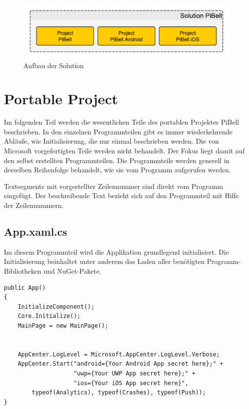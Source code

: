 \begin{figure}[H]
\centering\includegraphics[width=0.9\linewidth]{images/xamarin/struktur.pdf}
\caption{Aufbau der Solution}
\end{figure}

%
\section{Portable Project}
Im folgenden Teil werden die wesentlichen Teile des portablen Projektes PiBell beschrieben.
In den einzelnen Programmteilen gibt es immer wiederkehrende Abläufe, wie Initialisierung, die nur einmal beschrieben werden.
Die von Microsoft vorgefertigten Teile werden nicht behandelt.
Der Fokus liegt damit auf den selbst erstellten Programmteilen.
Die Programmteile werden generell in derselben Reihenfolge behandelt, wie sie vom Programm aufgerufen werden.\par

Textsegmente mit vorgestellter Zeilennummer sind direkt vom Programm eingefügt.
Der beschreibende Text bezieht sich auf den Programmteil mit Hilfe der Zeilennummern.

\subsection{App.xaml.cs}
\label{ssec:app-xaml-cs}
Im diesem Programmteil wird die Applikation grundlegend initialisiert.
Die Initialisierung beinhaltet unter anderem das Laden aller benötigten Programm-Bibliotheken und NuGet-Pakete.
\begin{verbatim}
public App()
{
    InitializeComponent();
    Core.Initialize();
    MainPage = new MainPage();


    AppCenter.LogLevel = Microsoft.AppCenter.LogLevel.Verbose;
    AppCenter.Start("android={Your Android App secret here};" +
                    "uwp={Your UWP App secret here};" +
                    "ios={Your iOS App secret here}",
        typeof(Analytics), typeof(Crashes), typeof(Push));
}
\end{verbatim}
